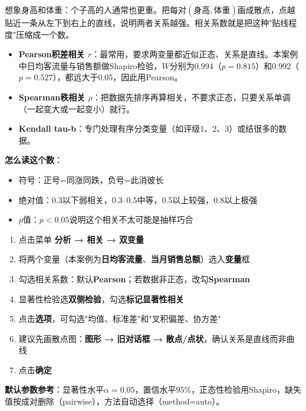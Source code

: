 \begin{algoprinciple}
想象身高和体重：个子高的人通常也更重。把每对$(身高,体重)$画成散点，点越贴近一条从左下到右上的直线，说明两者关系越强。相关系数就是把这种"贴线程度"压缩成一个数。

\begin{itemize}
    \item \textbf{Pearson积差相关 $r$}：最常用，要求两变量都近似正态、关系是直线。本案例中日均客流量与销售额做Shapiro检验，$W$分别为0.994（$p=0.815$）和0.992（$p=0.527$），都远大于0.05，因此用Pearson。
    \item \textbf{Spearman秩相关 $\rho$}：把数据先排序再算相关，不要求正态，只要关系单调（一起变大或一起变小）就行。
    \item \textbf{Kendall tau-b}：专门处理有序分类变量（如评级1、2、3）或结很多的数据。
\end{itemize}

\textbf{怎么读这个数}：
\begin{itemize}
    \item 符号：正号=同涨同跌，负号=此消彼长
    \item 绝对值：0.3以下弱相关，0.3--0.5中等，0.5以上较强，0.8以上极强
    \item $p$值：$p<0.05$说明这个相关不太可能是抽样巧合
\end{itemize}
\end{algoprinciple}

\begin{algosposs}
\begin{enumerate}
    \item 点击菜单 \textbf{分析 → 相关 → 双变量}
    \item 将两个变量（本案例为\textbf{日均客流量}、\textbf{当月销售总额}）选入\textbf{变量}框
    \item 勾选相关系数：默认\textbf{Pearson}；若数据非正态，改勾\textbf{Spearman}
    \item 显著性检验选\textbf{双侧检验}，勾选\textbf{标记显著性相关}
    \item 点击\textbf{选项}，可勾选"均值、标准差"和"叉积偏差、协方差"
    \item 建议先画散点图：\textbf{图形 → 旧对话框 → 散点/点状}，确认关系是直线而非曲线
    \item 点击\textbf{确定}
\end{enumerate}

\textbf{默认参数参考}：显著性水平$\alpha=0.05$，置信水平95\%，正态性检验用Shapiro，缺失值按成对删除（pairwise），方法自动选择（method=auto）。
\end{algosposs}

